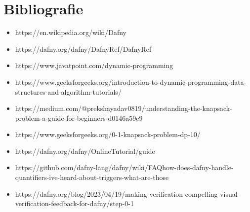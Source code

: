 \chapter*{Bibliografie} 
\begin{sloppypar}

\begin{itemize}
    \item https://en.wikipedia.org/wiki/Dafny
    \item https://dafny.org/dafny/DafnyRef/DafnyRef
    \item https://www.javatpoint.com/dynamic-programming
    \item https://www.geeksforgeeks.org/introduction-to-dynamic-programming-data-structures-and-algorithm-tutorials/
    \item https://medium.com/@prekshayadav0819/understanding-the-knapsack-problem-a-guide-for-beginners-d0146a59e9
    \item https://www.geeksforgeeks.org/0-1-knapsack-problem-dp-10/
    \item https://dafny.org/dafny/OnlineTutorial/guide
    \item https://github.com/dafny-lang/dafny/wiki/FAQ{\texthash}how-does-dafny-handle-quantifiers-ive-heard-about-triggers-what-are-those
    \item https://dafny.org/blog/2023/04/19/making-verification-compelling-visual-verification-feedback-for-dafny/{\texthash}step-0-1
\end{itemize}
\end{sloppypar}